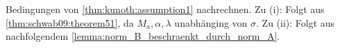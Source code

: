 \begin{Beweis}
Bedingungen von \cref{thm:kunoth:assumption1} nachrechnen.
Zu (i): Folgt aus \cref{thm:schwab09:theorem51}, da $M_{a}, \alpha, \lambda$ unabhänging von $\sigma$.
Zu (ii): Folgt aus nachfolgendem \cref{lemma:norm_B_beschraenkt_durch_norm_A}.
\end{Beweis}
